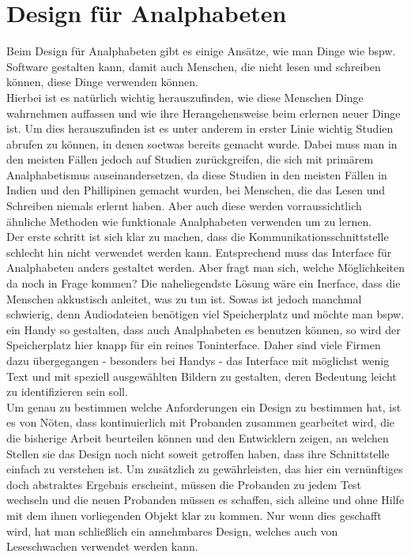 \section{Design für Analphabeten}

Beim Design für Analphabeten gibt es einige Ansätze, wie man Dinge wie bspw. Software gestalten kann, damit auch Menschen, die nicht lesen und schreiben können, diese Dinge verwenden können.\\
Hierbei ist es natürlich wichtig herauszufinden, wie diese Menschen Dinge wahrnehmen auffassen und wie ihre Herangehensweise beim erlernen neuer Dinge ist. Um dies herauszufinden ist es unter anderem in erster Linie wichtig Studien abrufen zu können, in denen soetwas bereits gemacht wurde. Dabei muss man in den meisten Fällen jedoch auf Studien zurückgreifen, die sich mit primärem Analphabetismus auseinandersetzen, da diese Studien in den meisten Fällen in Indien und den Phillipinen gemacht wurden, bei Menschen, die das Lesen und Schreiben niemals erlernt haben. Aber auch diese werden vorraussichtlich ähnliche Methoden wie funktionale Analphabeten verwenden um zu lernen.\\
Der erste schritt ist sich klar zu machen, dass die Kommunikationsschnittstelle schlecht hin nicht verwendet werden kann. Entsprechend muss das Interface für Analphabeten anders gestaltet werden. Aber fragt man sich, welche Möglichkeiten da noch in Frage kommen? Die naheliegendste Lösung wäre ein Inerface, dass die Menschen akkustisch anleitet, was zu tun ist. Sowas ist jedoch manchmal schwierig, denn Audiodateien benötigen viel Speicherplatz und möchte man bspw. ein Handy so gestalten, dass auch Analphabeten es benutzen können, so wird der Speicherplatz hier knapp für ein reines Toninterface. Daher sind viele Firmen dazu übergegangen - besonders bei Handys - das Interface mit möglichst wenig Text und mit speziell ausgewählten Bildern zu gestalten, deren Bedeutung leicht zu identifizieren sein soll.\\
Um genau zu bestimmen welche Anforderungen ein Design zu bestimmen hat, ist es von Nöten, dass kontinuierlich mit Probanden zusammen gearbeitet wird, die die bisherige Arbeit beurteilen können und den Entwicklern zeigen, an welchen Stellen sie das Design noch nicht soweit getroffen haben, dass ihre Schnittstelle einfach zu verstehen ist. Um zusätzlich zu gewährleisten, das hier ein vernünftiges doch abstraktes Ergebnis erscheint, müssen die Probanden zu jedem Test wechseln und die neuen Probanden müssen es schaffen, sich alleine und ohne Hilfe mit dem ihnen vorliegenden Objekt klar zu kommen. Nur wenn dies geschafft wird, hat man schließlich ein annehmbares Design, welches auch von Leseschwachen verwendet werden kann.\\

